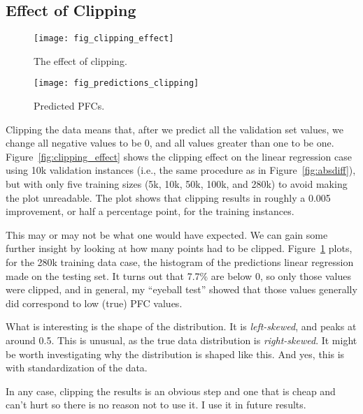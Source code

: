 \documentclass[a4paper, 11pt]{article}
\begin{document}
\subsection{Effect of Clipping}

\begin{figure}[t]
  \centering
  \begin{minipage}{.48\textwidth}
    \centering
    \texttt{[image: fig\_clipping\_effect]}
    \caption{The effect of clipping.}
    \label{fig:clipping_effect}
  \end{minipage}\hfill
    \begin{minipage}{.48\textwidth}
    \centering
    \texttt{[image: fig\_predictions\_clipping]}
    \caption{Predicted PFCs.}
    \label{fig:pred_hist}
  \end{minipage}
\end{figure}

Clipping the data means that, after we predict all the validation set values, we change all negative
values to be 0, and all values greater than one to be one. Figure~\ref{fig:clipping_effect} shows
the clipping effect on the linear regression case using 10k validation instances (i.e., the same
procedure as in Figure~\ref{fig:absdiff}), but with only five training sizes (5k, 10k, 50k, 100k,
and 280k) to avoid making the plot unreadable. The plot shows that clipping results in roughly a
0.005 improvement, or half a percentage point, for the training instances.

This may or may not be what one would have expected. We can gain some further insight by looking at
how many points had to be clipped. Figure~\ref{fig:pred_hist} plots, for the 280k training data
case, the histogram of the predictions linear regression made on the testing set. It turns out that
7.7\% are below 0, so only those values were clipped, and in general, my ``eyeball test'' showed
that those values generally did correspond to low (true) PFC values.

What is interesting is the shape of the distribution. It is \emph{left-skewed}, and peaks at around
0.5. This is unusual, as the true data distribution is \emph{right-skewed}. It might be worth
investigating why the distribution is shaped like this. And yes, this is with standardization of the
data.

In any case, clipping the results is an obvious step and one that is cheap and can't hurt so there
is no reason not to use it. I use it in future results.
\end{document}

